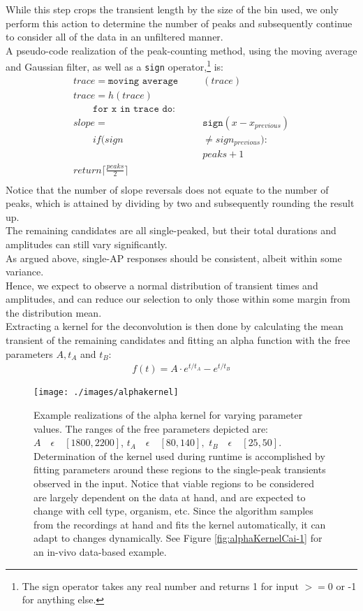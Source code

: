 \documentclass[titlepage]{article}
\begin{document}
While this step crops the transient length by the size of the bin used, we only perform this action to determine the number of peaks and subsequently continue to consider all of the data in an unfiltered manner.\\
A pseudo-code realization of the peak-counting method, using the moving average and Gaussian filter, as well as a \texttt{sign} operator,\footnote{The sign operator takes any real number and returns 1 for input $>=0$ or -1 for anything else.} is:
\begin{align*}
trace = \texttt{moving average}&(trace)\\
trace = h(trace)\qquad\qquad&\\
\qquad \texttt{for x in trace do:}\qquad&\\
slope =&  \texttt{sign}(x-x_{previous})\\
\qquad if (sign &\neq sign_{previous}):\\
& peaks + 1\\
return \lceil\frac{peaks}{2}\rceil\qquad\qquad\\
\end{align*}
Notice that the number of slope reversals does not equate to the number of peaks, which is attained by dividing by two and subsequently rounding the result up.\\
The remaining candidates are all single-peaked, but their total durations and amplitudes can still vary significantly.\\
As argued above, single-AP responses should be consistent, albeit within some variance.\\
Hence, we expect to observe a normal distribution of transient times and amplitudes, and can reduce our selection to only those within some margin from the distribution mean.\\
Extracting a kernel for the deconvolution is then done by calculating the mean transient of the remaining candidates and fitting an alpha function with the free parameters $A, t_A$ and $t_B$:
\begin{align}
f(t) = A \cdot e^{t/t_A} -  e^{t/t_B} 
\end{align}
\begin{figure}[h]
\centering
\texttt{[image: ./images/alphakernel]}
\caption{Example realizations of the alpha kernel for varying parameter values. The ranges of the free parameters depicted are: $A \quad \epsilon\quad [1800,2200]$, $ t_A \quad \epsilon\quad [80,140],$ $t_B\quad \epsilon\quad [25,50]$. Determination of the kernel used during runtime is accomplished by fitting parameters around these regions to the single-peak transients observed in the input. Notice that viable regions to be considered are largely dependent on the data at hand, and are expected to change with cell type, organism, etc. Since the algorithm samples from the recordings at hand and fits the kernel automatically, it can adapt to changes dynamically. See Figure \ref{fig:alphaKernelCai-1} for an in-vivo data-based example.}
\label{fig:alphakernel}
\end{figure}
\end{document}

